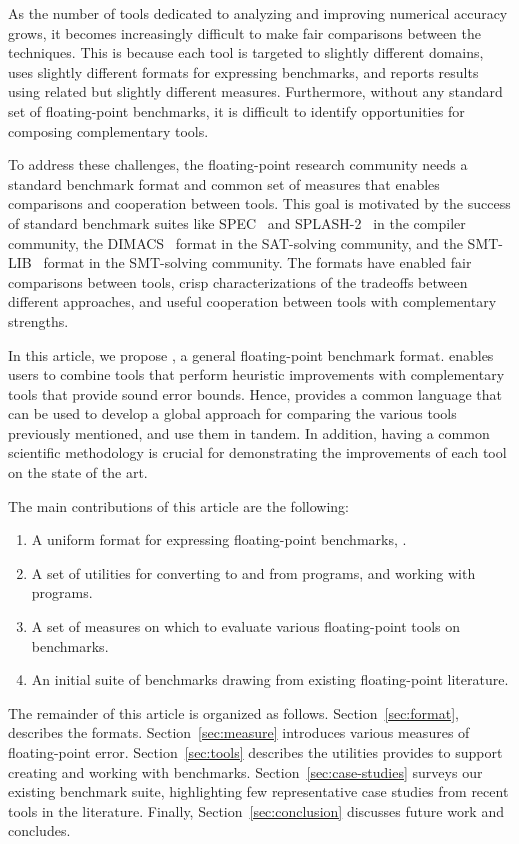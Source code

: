 \documentclass[main.tex]{subfiles}
\begin{document}
As the number of tools dedicated to analyzing and improving numerical
accuracy grows, it becomes increasingly difficult to make fair
comparisons between the techniques.  This is because each tool is targeted
to slightly different domains, uses slightly different formats for
expressing benchmarks, and reports results using related but slightly
different measures.  Furthermore, without any standard set of floating-point
benchmarks, it is difficult to identify opportunities for composing
complementary tools.

To address these challenges, the floating-point research community needs a
standard benchmark format and common set of measures that enables
comparisons and cooperation between tools.  This goal is motivated by the
success of standard benchmark suites like SPEC~\cite{spec} and
SPLASH-2~\cite{splash} in
the compiler community, the DIMACS~\cite{dimacs} format in the SAT-solving
community, and the SMT-LIB~\cite{smtlib} format in the SMT-solving community.
The formats have enabled fair comparisons between tools, crisp
characterizations of the tradeoffs between different approaches, and useful
cooperation between tools with complementary strengths.

In this article, we propose \name, a general floating-point benchmark
format. \name enables users to combine tools that perform heuristic
improvements with complementary tools that provide sound error bounds.
Hence, \name provides a common language that can be used to develop
a global approach for comparing the various tools previously mentioned,
and use them in tandem. In addition, having a common scientific methodology
is crucial for demonstrating the improvements of each tool on the state
of the art.

The main contributions of this article are the following:
\begin{enumerate}[label=(\roman*)]
%
\item A uniform format for expressing floating-point benchmarks, \core.
%
\item A set of utilities for converting to and from \core programs, and
  working with \core programs.
%
\item A set of measures on which to evaluate various floating-point tools
  on \name benchmarks.
%
\item An initial suite of benchmarks drawing from existing floating-point
  literature.
%
\end{enumerate}

The remainder of this article is organized as follows.
Section~\ref{sec:format}, describes the \name formats.
Section~\ref{sec:measure} introduces various measures of floating-point
error.  Section~\ref{sec:tools} describes the utilities \name provides to
support creating and working with benchmarks.
Section~\ref{sec:case-studies} surveys our existing benchmark suite,
highlighting few representative case studies from recent tools in the
literature.  Finally, Section~\ref{sec:conclusion} discusses future work
and concludes.
\end{document}
